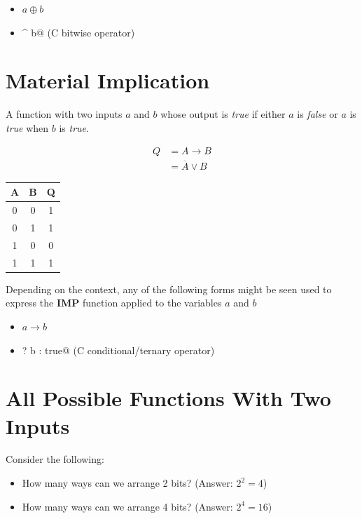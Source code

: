 \documentclass[10pt]{article}
\begin{document}
\begin{itemize}
\item $a \oplus b$
\item \verb@a ^ b@ (C bitwise operator)
\end{itemize}

\section{Material Implication}

A function with two inputs $a$ and $b$ whose output is {\em true} if either $a$ is 
{\em false} or $a$ is {\em true} when $b$ is {\em true}.

\begin{align}
Q & = A \rightarrow B\\
  & = \overline{A} \lor B 
\end{align}

\begin{center}
\begin{tabular}{|cc|c|}
\hline
A & B & Q \\
\hline
0 & 0 & 1 \\
0 & 1 & 1 \\
1 & 0 & 0 \\
1 & 1 & 1 \\
\hline
\end{tabular}
\end{center}

Depending on the context, any of the following forms might be seen used to 
express the {\bfseries IMP} function applied to the variables $a$ and $b$


\begin{itemize}
\item $a \rightarrow b$
\item \verb@a ? b : true@ (C conditional/ternary operator)
\end{itemize}



\section{All Possible Functions With Two Inputs}

Consider the following:
\begin{itemize}
\item How many ways can we arrange 2 bits?  (Answer: $2^2 = 4$)
\item How many ways can we arrange 4 bits?  (Answer: $2^4 = 16$)
\end{itemize}
\end{document}
